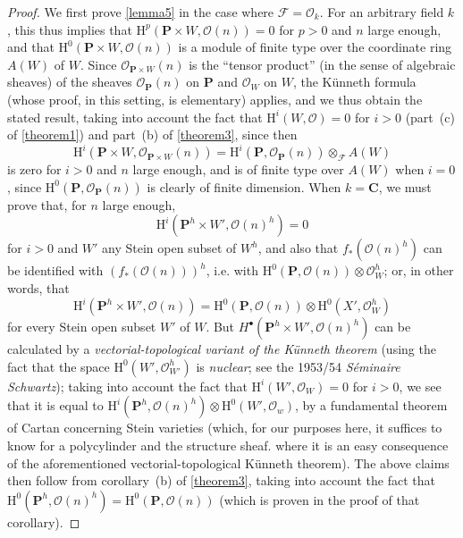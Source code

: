\documentclass{article}
\theoremstyle{plain}
\theoremstyle{definition}
\newcommand{\sh}{\mathscr}
\newcommand{\HH}{\mathrm{H}}
\newcommand{\oldpage}[1]{\marginpar{\footnotesize$\Big\vert$ \textit{p.~#1}}}
\begin{document}
\begin{proof}
  We first prove \cref{lemma5} in the case where $\sh{F}=\sh{O}_k$.
  For an arbitrary field $k$, this thus implies that $\HH^p(\mathbf{P}\times W,\sh{O}(n))=0$ for $p>0$ and $n$ large enough, and that $\HH^0(\mathbf{P}\times W,\sh{O}(n))$ is a module of finite type over the coordinate ring $A(W)$ of $W$.
  Since $\sh{O}_{\mathbf{P}\times W}(n)$ is the ``tensor product'' (in the sense of algebraic sheaves) of the sheaves $\sh{O}_\mathbf{P}(n)$ on $\mathbf{P}$ and $\sh{O}_W$ on $W$, the K\"{u}nneth formula (whose proof, in this setting, is elementary) applies, and we thus obtain the stated result, taking into account the fact that $\HH^i(W,\sh{O})=0$ for $i>0$ (part~(c) of \cref{theorem1}) and part~(b) of \cref{theorem3}, since then
  \[
    \HH^i(\mathbf{P}\times W,\sh{O}_{\mathbf{P}\times W}(n))
    = \HH^i(\mathbf{P},\sh{O}_\mathbf{P}(n))\otimes_\sh{F} A(W)
  \]
  is zero for $i>0$ and $n$ large enough, and is of finite type over $A(W)$ when $i=0$, since $\HH^0(\mathbf{P},\sh{O}_\mathbf{P}(n))$ is clearly of finite dimension.
  When $k=\mathbf{C}$, we must prove that, for $n$ large enough, \[\HH^i(\mathbf{P}^h\times W',\sh{O}(n)^h)=0\] for $i>0$ and $W'$ any Stein open subset of $W^h$, and also that $f_*(\sh{O}(n)^h)$ can be identified with $(f_*(\sh{O}(n)))^h$, i.e. with $\HH^0(\mathbf{P},\sh{O}(n))\otimes\sh{O}_W^h$;
  or, in other words, that
  \[
    \HH^i(\mathbf{P}^h\times W',\sh{O}(n))
    = \HH^0(\mathbf{P},\sh{O}(n))\otimes\HH^0(X',\sh{O}_W^h)
  \]
  for every Stein open subset $W'$ of $W$.
  But $H^\bullet(\mathbf{P}^h\times W',\sh{O}(n)^h)$ can be calculated by a \emph{vectorial-topological variant of the K\"{u}nneth theorem} (using the fact that the space
\oldpage{2-13}
  $\HH^0(W',\sh{O}_{W'}^h)$ is \emph{nuclear};
  see the 1953/54 \emph{S\'{e}minaire Schwartz});
  taking into account the fact that $\HH^i(W',\sh{O}_W)=0$ for $i>0$, we see that it is equal to $\HH^i(\mathbf{P}^h,\sh{O}(n)^h)\otimes\HH^0(W',\sh{O}_w)$, by a fundamental theorem of Cartan concerning Stein varieties (which, for our purposes here, it suffices to know for a polycylinder and the structure sheaf. where it is an easy consequence of the aforementioned vectorial-topological K\"{u}nneth theorem).
  The above claims then follow from corollary~(b) of \cref{theorem3}, taking into account the fact that $\HH^0(\mathbf{P}^h,\sh{O}(n)^h)=\HH^0(\mathbf{P},\sh{O}(n))$ (which is proven in the proof of that corollary).


\end{proof}
\end{document}
